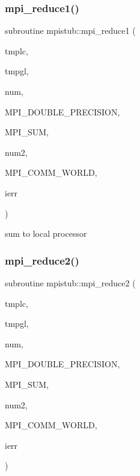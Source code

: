 \subsubsection{\texorpdfstring{mpi\_reduce1()}{mpi\_reduce1()}}
{\footnotesize\ttfamily subroutine mpistub\+::mpi\+\_\+reduce1 (\begin{DoxyParamCaption}\item[{double precision, dimension(\+:)}]{tmplc,  }\item[{double precision, dimension(\+:)}]{tmpgl,  }\item[{}]{num,  }\item[{}]{M\+P\+I\+\_\+\+D\+O\+U\+B\+L\+E\+\_\+\+P\+R\+E\+C\+I\+S\+I\+ON,  }\item[{}]{M\+P\+I\+\_\+\+S\+UM,  }\item[{}]{num2,  }\item[{}]{M\+P\+I\+\_\+\+C\+O\+M\+M\+\_\+\+W\+O\+R\+LD,  }\item[{}]{ierr }\end{DoxyParamCaption})}



sum to local processor 

\mbox{\label{namespacempistub_a1b64afd5481e729d54724f7427b4a32f}} 
\subsubsection{\texorpdfstring{mpi\_reduce2()}{mpi\_reduce2()}}
{\footnotesize\ttfamily subroutine mpistub\+::mpi\+\_\+reduce2 (\begin{DoxyParamCaption}\item[{double precision}]{tmplc,  }\item[{double precision}]{tmpgl,  }\item[{}]{num,  }\item[{}]{M\+P\+I\+\_\+\+D\+O\+U\+B\+L\+E\+\_\+\+P\+R\+E\+C\+I\+S\+I\+ON,  }\item[{}]{M\+P\+I\+\_\+\+S\+UM,  }\item[{}]{num2,  }\item[{}]{M\+P\+I\+\_\+\+C\+O\+M\+M\+\_\+\+W\+O\+R\+LD,  }\item[{}]{ierr }\end{DoxyParamCaption})}

\mbox{\label{namespacempistub_a781c5f26f7ee9bdffdc195be7eaa07ef}} 
